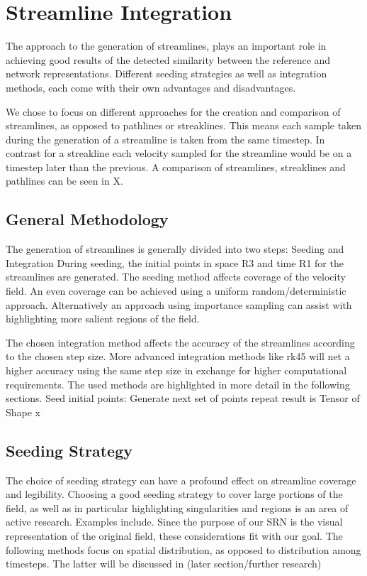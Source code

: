 
\chapter{Streamline Integration}\label{chapter:streamlines}
The approach to the generation of streamlines, plays an important role in achieving good results of the detected similarity between the reference and network representations.
Different seeding strategies as well as integration methods, each come with their own advantages and disadvantages.

We chose to focus on different approaches for the creation and comparison of streamlines, as opposed to pathlines or streaklines.
This means each sample taken during the generation of a streamline is taken from the same timestep. 
In contrast for a streakline each velocity sampled for the streamline would be on a timestep later than the previous.
A comparison of streamlines, streaklines and pathlines can be seen in X.
\section{General Methodology}
The generation of streamlines is generally divided into two steps: Seeding and Integration
During seeding, the initial points in space R3 and time R1 for the streamlines are generated.
The seeding method affects coverage of the velocity field. An even coverage can be achieved using a uniform random/deterministic approach. 
Alternatively an approach using importance sampling can assist with highlighting more salient regions of the field.

The chosen integration method affects the accuracy of the streamlines according to the chosen step size.
More advanced integration methods like rk45 will net a higher accuracy using the same step size in exchange for higher computational requirements.
The used methods are highlighted in more detail in the following sections.
Seed initial points:
Generate next set of points
repeat
result is Tensor of Shape x
\section{Seeding Strategy}
The choice of seeding strategy can have a profound effect on streamline coverage and legibility.
Choosing a good seeding strategy to cover large portions of the field, as well as in particular highlighting singularities and regions is an area of active research. Examples include.
Since the purpose of our SRN is the visual representation of the original field, these considerations fit with our goal.
The following methods focus on spatial distribution, as opposed to distribution among timesteps. 
The latter will be discussed in (later section/further research)
